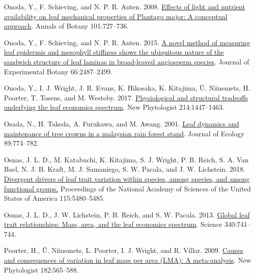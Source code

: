 \documentclass[
  12pt,
  a4paper,
,tablecaptionabove
]{scrartcl}
\newlength{\cslhangindent}
\newenvironment{CSLReferences}[2] %
 {%
  \setlength{\parindent}{0pt}
  \ifodd #1 \everypar{\setlength{\hangindent}{\cslhangindent}}\ignorespaces\fi
  \ifnum #2 > 0
  \setlength{\parskip}{#2\baselineskip}
  \fi
 }%
 {}
\begin{document}
\begin{CSLReferences}{1}{0}
\leavevmode{}%
Onoda, Y., F. Schieving, and N. P. R. Anten. 2008.
\href{https://doi.org/10.1093/aob/mcn013}{Effects of light and nutrient
availability on leaf mechanical properties of {Plantago} major: {A}
conceptual approach}. Annals of Botany 101:727--736.

\leavevmode{}%
Onoda, Y., F. Schieving, and N. P. R. Anten. 2015.
\href{https://doi.org/10.1093/jxb/erv024}{A novel method of measuring
leaf epidermis and mesophyll stiffness shows the ubiquitous nature of
the sandwich structure of leaf laminas in broad-leaved angiosperm
species}. Journal of Experimental Botany 66:2487--2499.

\leavevmode{}%
Onoda, Y., I. J. Wright, J. R. Evans, K. Hikosaka, K. Kitajima, Ü.
Niinemets, H. Poorter, T. Tosens, and M. Westoby. 2017.
\href{https://doi.org/10.1111/nph.14496}{Physiological and structural
tradeoffs underlying the leaf economics spectrum}. New Phytologist
214:1447--1463.

\leavevmode{}%
Osada, N., H. Takeda, A. Furukawa, and M. Awang. 2001.
\href{https://doi.org/10.1046/j.0022-0477.2001.00590.x}{Leaf dynamics
and maintenance of tree crowns in a malaysian rain forest stand}.
Journal of Ecology 89:774--782.

\leavevmode{}%
Osnas, J. L. D., M. Katabuchi, K. Kitajima, S. J. Wright, P. B. Reich,
S. A. Van Bael, N. J. B. Kraft, M. J. Samaniego, S. W. Pacala, and J. W.
Lichstein. 2018.
\href{https://doi.org/10.1073/pnas.1803989115}{Divergent drivers of leaf
trait variation within species, among species, and among functional
groups.} Proceedings of the National Academy of Sciences of the United
States of America 115:5480--5485.

\leavevmode{}%
Osnas, J. L. D., J. W. Lichstein, P. B. Reich, and S. W. Pacala. 2013.
\href{https://doi.org/10.1126/science.1231574}{Global leaf trait
relationships: {Mass}, area, and the leaf economics spectrum}. Science
340:741--744.

\leavevmode{}%
Poorter, H., Ü. Niinemets, L. Poorter, I. J. Wright, and R. Villar.
2009. \href{https://doi.org/10.1111/j.1469-8137.2009.02830.x}{Causes and
consequences of variation in leaf mass per area ({LMA}): {A}
meta-analysis}. New Phytologist 182:565--588.


\end{CSLReferences}
\end{document}
